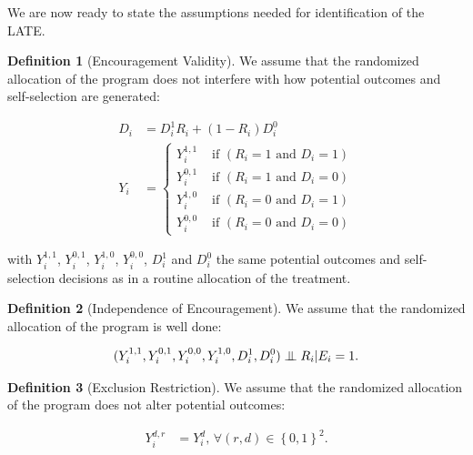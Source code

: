 \documentclass[
]{book}
\newcommand\Ind{\protect\mathpalette{\protect\independenT}{\perp}}
\def\independenT#1#2{\mathrel{\setbox0\hbox{$#1#2$}\copy0\kern-\wd0\mkern4mu\box0}}
\theoremstyle{definition}
\newtheorem{definition}{Definition}[chapter]
\theoremstyle{definition}
\theoremstyle{definition}
\theoremstyle{definition}
\theoremstyle{remark}
\begin{document}
We are now ready to state the assumptions needed for identification of the LATE.

\begin{definition}[Encouragement Validity]
\protect\hypertarget{def:RandEncouragValid}{}{\label{def:RandEncouragValid} \iffalse (Encouragement Validity) \fi{} }We assume that the randomized allocation of the program does not interfere with how potential outcomes and self-selection are generated:

\begin{align*}
D_i & = D_i^1R_i+(1-R_i)D_i^0 \\
Y_i & = 
  \begin{cases}
    Y_i^{1,1} & \text{ if } (R_i=1 \text{ and } D_i=1)   \\
    Y_i^{0,1} & \text{ if } (R_i=1 \text{ and } D_i=0)    \\
    Y_i^{1,0} & \text{ if } (R_i=0 \text{ and } D_i=1)    \\
    Y_i^{0,0} & \text{ if } (R_i=0 \text{ and } D_i=0)    
  \end{cases}
\end{align*}
\end{definition}
with \(Y_i^{1,1}\), \(Y_i^{0,1}\), \(Y_i^{1,0}\), \(Y_i^{0,0}\), \(D_i^1\) and \(D^0_i\) the same potential outcomes and self-selection decisions as in a routine allocation of the treatment.

\begin{definition}[Independence of Encouragement]
\protect\hypertarget{def:IndepEncourag}{}{\label{def:IndepEncourag} \iffalse (Independence of Encouragement) \fi{} }We assume that the randomized allocation of the program is well done:

\begin{align*}
(Y_i^{1,1},Y_i^{0,1},Y_i^{0,0},Y_i^{1,0},D_i^1,D^0_i)\Ind R_i|E_i=1.
\end{align*}
\end{definition}

\begin{definition}[Exclusion Restriction]
\protect\hypertarget{def:ExclRestr}{}{\label{def:ExclRestr} \iffalse (Exclusion Restriction) \fi{} }We assume that the randomized allocation of the program does not alter potential outcomes:

\begin{align*}
Y_i^{d,r} & = Y_i^d \text{, }\forall (r,d)\in\left\{0,1\right\}^2.
\end{align*}
\end{definition}
\end{document}
